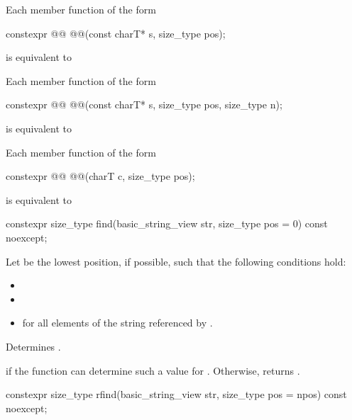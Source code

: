 \pnum
Each member function of the form
\begin{codeblock}
constexpr @@ @@(const charT* s, size_type pos);
\end{codeblock}
is equivalent to 

\pnum
Each member function of the form
\begin{codeblock}
constexpr @@ @@(const charT* s, size_type pos, size_type n);
\end{codeblock}
is equivalent to 

\pnum
Each member function of the form
\begin{codeblock}
constexpr @@ @@(charT c, size_type pos);
\end{codeblock}
is equivalent to 

%
\begin{itemdecl}
constexpr size_type find(basic_string_view str, size_type pos = 0) const noexcept;
\end{itemdecl}

\begin{itemdescr}
\pnum
Let  be the lowest position, if possible, such that the following conditions hold:
\begin{itemize}
\item
{}
\item
{}
\item
{} for all elements  of the string referenced by .
\end{itemize}

\pnum
\effects
Determines .

\pnum
\returns
{} if the function can determine such a value for .
Otherwise, returns .
\end{itemdescr}

%
\begin{itemdecl}
constexpr size_type rfind(basic_string_view str, size_type pos = npos) const noexcept;
\end{itemdecl}

